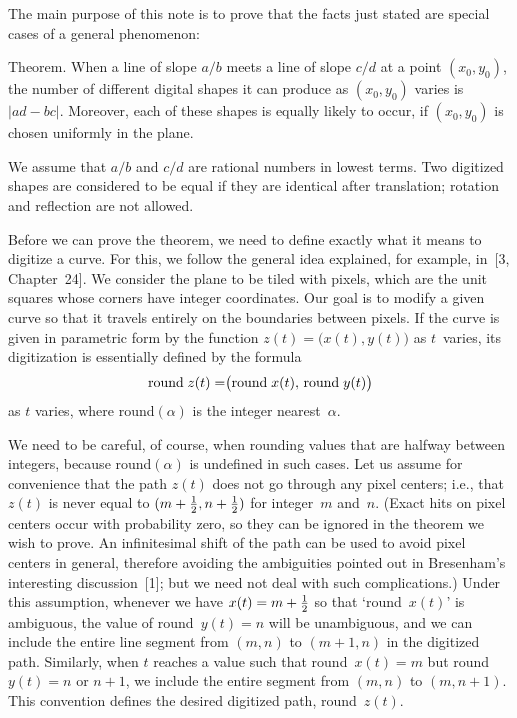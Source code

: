 The main purpose of this note is to prove that the facts just stated
are special cases of a general phenomenon:

\proclaim Theorem. When a line of slope $a/b$ meets a line of slope
$c/d$ at a point $(x_0,y_0)$, the number of different digital shapes
it can produce as $(x_0,y_0)$ varies is $\vert ad-bc\vert$. Moreover,
each of these shapes is equally likely to occur, if $(x_0,y_0)$ is
chosen uniformly in the plane.

\noindent
We assume that $a/b$ and $c/d$ are rational numbers in lowest terms.
Two digitized shapes are considered to be equal if they are identical
after translation; rotation and reflection are not allowed.

Before we can prove the theorem, we need to define exactly what it
means to digitize a curve. For this, we follow the general idea
explained, for example, in~[3, Chapter~24]. We consider the plane to
be tiled with pixels, which are the unit squares whose corners have
integer coordinates. Our goal is to modify a given curve so that it
travels entirely on the boundaries between pixels. If
 the curve is given in parametric form by the function
$z(t)=\bigl(x(t),y(t)\bigr)$ as $t$~varies, its digitization is
essentially defined by the formula
$${\rm round}\;z(t)=\bigr({\rm round}\;x(t),\,{\rm round}\;
y(t)\bigr)$$
as $t$ varies, where  round$(\alpha)$  is the integer
nearest~$\alpha$. 

We need to be careful, of course, when rounding values that are
halfway between integers, because round$(\alpha)$ is undefined
in such cases. Let us assume for convenience that the path $z(t)$ does
not go through any pixel centers; i.e., that $z(t)$ is never equal to
$(m+{1\over 2},n+{1\over 2})$ for integer~$m$ and~$n$. (Exact hits on
pixel centers occur with probability zero, so they can be ignored in
the theorem we wish to prove. An infinitesimal shift of the path can
be used to avoid pixel centers in general, 
therefore avoiding the ambiguities pointed out in Bresenham's
interesting discussion~[1]; but we need not deal with
such complications.) Under this assumption, whenever we have
$x(t)=m+{1\over 2}$ so that `round~$x(t)$'  is ambiguous, the
value of  round~$y(t)=n$ will be unambiguous, and we can
include the entire line segment from $(m,n)$ to $(m+1,n)$ in the
digitized path. Similarly, when $t$ reaches a value such that
round~$x(t)=m$ but  round~$y(t)=n$ 
or $n+1$, we include the
entire segment from $(m,n)$ to $(m,n+1)$. This convention defines the
desired digitized path, round~$z(t)$.

